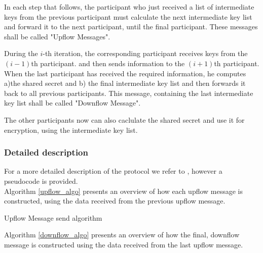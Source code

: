 \documentclass[12pt,titlepage,a4paper]{article}
\begin{document}
{In each step that follows, the participant who just received a list of intermediate
keys from the previous participant must calculate the next intermediate key list and
forward it to the next participant, until the final participant. These messages
shall be called "Upflow Messages".

During the $i$-th iteration, the corresponding participant receives keys from the
$(i - 1)$th participant. and then sends information to the $(i + 1)$th participant.
When the last participant has received the required information, he computes a)the
shared secret and b) the final intermediate key list and then forwards it back to
all previous participants. This message, containing the last intermediate key list
shall be called "Downflow Message".

The other participants now can also caclulate the shared secret and use it for
encryption, using the intermediate key list.

\subsubsection{Detailed description}
For a more detailed description of the protocol we refer to \cite{mpenc}, however
a pseudocode is provided.\\

Algorithm \ref{upflow_algo} presents an overview of how each upflow message is constructed, using the data received from the previous upflow message.\\

\begin{algorithm}[H]
	\caption{Upflow Message send algorithm}
	\label{upflow_algo}
\end{algorithm}

Algorithm \ref{downflow_algo} presents an overview of how the final, downflow message is constructed using the data received from the last upflow message.\\

}
\end{document}
